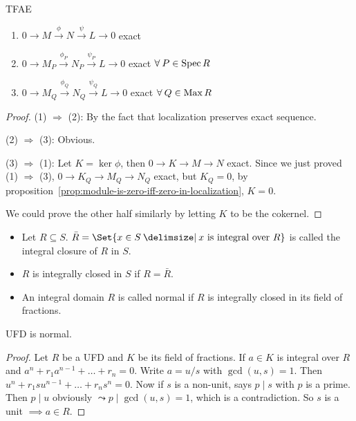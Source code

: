 \begin{prop} \label{prop:localization-preserves-exactness}
  TFAE
  \begin{enumerate}[(1)]
    \item $0 \to M \xrightarrow{\phi} N \xrightarrow{\psi} L \to 0$ exact
    \item $0 \to M_P \xrightarrow{\phi_P} N_P \xrightarrow{\psi_P} L \to 0$
      exact $\forall P \in \Spec R$
    \item $0 \to M_Q \xrightarrow{\phi_Q} N_Q \xrightarrow{\psi_Q} L \to 0$
      exact $\forall Q \in \Max R$
  \end{enumerate}
  \begin{proof}
    (1) $\Rightarrow$ (2): By the fact that localization preserves exact sequence.

    (2) $\Rightarrow$ (3): Obvious.

    (3) $\Rightarrow$ (1): Let $K = \ker \phi$, then $0 \to K \to M \to N$
    exact. Since we just proved (1) $\Rightarrow$ (3),
    $0 \to K_Q \to M_Q \to N_Q$ exact, but $K_Q = 0$,
    by proposition~\ref{prop:module-is-zero-iff-zero-in-localization},
    $K = 0$.

    We could prove the other half similarly by letting $K$ to be the cokernel.
  \end{proof}
\end{prop}

\begin{definition} \mbox{}
  \begin{itemize}
    \item Let $R \subseteq S$. $\bar{R} = \Set{ x\in S \given x
      \text{ is integral over } R}$ is called the integral closure of $R$ in $S$.
    \item $R$ is integrally closed in $S$ if $R = \bar{R}$.
    \item An integral domain $R$ is called normal if $R$ is integrally closed
      in its field of fractions.
  \end{itemize}
\end{definition}

\begin{theorem} \label{thm:ufd-is-normal}
  UFD is normal.
  \begin{proof}
    Let $R$ be a UFD and $K$ be its field of fractions.
    If $a \in K$ is integral over $R$ and $a^n + r_1a^{n-1} + \dots + r_n = 0$.
    Write $a = u/s$ with $\gcd(u, s) = 1$.
    Then $u^n + r_1 s u^{n-1} + \dots + r_n s^n = 0$.
    Now if $s$ is a non-unit, says $p \mid s$ with $p$ is a prime. Then
    $p \mid u$ obviously $\leadsto p \mid \gcd(u, s) = 1$, which is a contradiction.
    So $s$ is a unit $\implies a \in R$.
  \end{proof}
\end{theorem}


